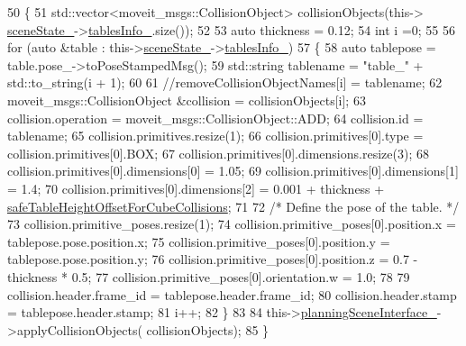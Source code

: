 \begin{DoxyCode}
50             \{
51                 std::vector<moveit\_msgs::CollisionObject> collisionObjects(this->
      \hyperlink{classsm__moveit__4_1_1cl__moveit__z__client_1_1CpConstraintTableWorkspaces_ae2d0e4852e944e8a870d5936de646d47}{sceneState\_}->\hyperlink{classsm__moveit__4_1_1cl__perception__system_1_1CpSceneState_a95f74dd16566d97e017650ccdf4b8a46}{tablesInfo\_}.size());
52                         
53                 \textcolor{keyword}{auto} thickness = 0.12;
54                 \textcolor{keywordtype}{int} i =0;
55                 
56                 \textcolor{keywordflow}{for} (\textcolor{keyword}{auto} &table : this->\hyperlink{classsm__moveit__4_1_1cl__moveit__z__client_1_1CpConstraintTableWorkspaces_ae2d0e4852e944e8a870d5936de646d47}{sceneState\_}->\hyperlink{classsm__moveit__4_1_1cl__perception__system_1_1CpSceneState_a95f74dd16566d97e017650ccdf4b8a46}{tablesInfo\_})
57                 \{
58                     \textcolor{keyword}{auto} tablepose = table.pose\_->toPoseStampedMsg();
59                     std::string tablename = \textcolor{stringliteral}{"table\_"} + std::to\_string(i + 1);
60 
61                     \textcolor{comment}{//removeCollisionObjectNames[i] = tablename;}
62                     moveit\_msgs::CollisionObject &collision = collisionObjects[i];
63                     collision.operation = moveit\_msgs::CollisionObject::ADD;
64                     collision.id = tablename;
65                     collision.primitives.resize(1);
66                     collision.primitives[0].type = collision.primitives[0].BOX;
67                     collision.primitives[0].dimensions.resize(3);
68                     collision.primitives[0].dimensions[0] = 1.05;
69                     collision.primitives[0].dimensions[1] = 1.4;
70                     collision.primitives[0].dimensions[2] = 0.001 + thickness + 
      \hyperlink{classsm__moveit__4_1_1cl__moveit__z__client_1_1CpConstraintTableWorkspaces_a8c9bd78c8330ae1446e5bc4d2891e285}{safeTableHeightOffsetForCubeCollisions};
71 
72                     \textcolor{comment}{/* Define the pose of the table. */}
73                     collision.primitive\_poses.resize(1);
74                     collision.primitive\_poses[0].position.x = tablepose.pose.position.x;
75                     collision.primitive\_poses[0].position.y = tablepose.pose.position.y;
76                     collision.primitive\_poses[0].position.z = 0.7 - thickness * 0.5;
77                     collision.primitive\_poses[0].orientation.w = 1.0;
78 
79                     collision.header.frame\_id = tablepose.header.frame\_id;
80                     collision.header.stamp = tablepose.header.stamp;
81                     i++;
82                 \}
83                 
84                 this->\hyperlink{classsm__moveit__4_1_1cl__moveit__z__client_1_1CpConstraintTableWorkspaces_a24d96bcde58af9e8aacbb4737859ac95}{planningSceneInterface\_}->applyCollisionObjects(
      collisionObjects);          
85             \}            
\end{DoxyCode}


